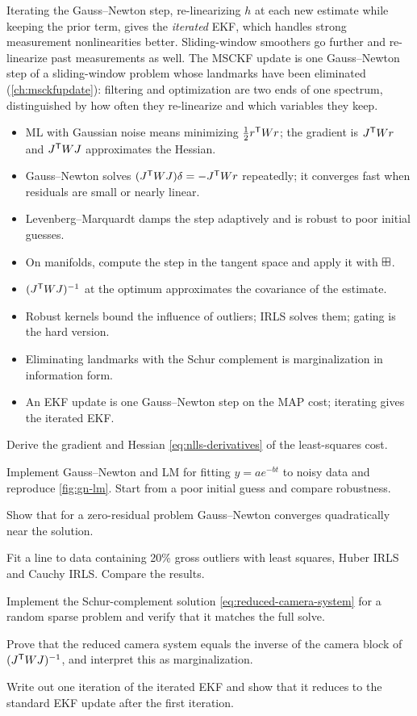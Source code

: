 Iterating the Gauss--Newton step, re-linearizing $h$ at each new estimate while keeping the prior term, gives the \emph{iterated} EKF, which
handles strong measurement nonlinearities better. Sliding-window smoothers go further and re-linearize past measurements as well. The MSCKF update
is one Gauss--Newton step of a sliding-window problem whose landmarks have been eliminated (\cref{ch:msckfupdate}): filtering and optimization
are two ends of one spectrum, distinguished by how often they re-linearize and which variables they keep.

\begin{takeaways}
\begin{itemize}
  \item ML with Gaussian noise means minimizing $\tfrac12 r^{\mathsf{T}} Wr$; the gradient is $J^{\mathsf{T}} Wr$ and $J^{\mathsf{T}} WJ$ approximates the Hessian.
  \item Gauss--Newton solves $(J^{\mathsf{T}} WJ)\delta = -J^{\mathsf{T}} Wr$ repeatedly; it converges fast when residuals are small or nearly linear.
  \item Levenberg--Marquardt damps the step adaptively and is robust to poor initial guesses.
  \item On manifolds, compute the step in the tangent space and apply it with $\boxplus$.
  \item $(J^{\mathsf{T}} WJ)^{-1}$ at the optimum approximates the covariance of the estimate.
  \item Robust kernels bound the influence of outliers; IRLS solves them; gating is the hard version.
  \item Eliminating landmarks with the Schur complement is marginalization in information form.
  \item An EKF update is one Gauss--Newton step on the MAP cost; iterating gives the iterated EKF.
\end{itemize}
\end{takeaways}

\begin{exercises}
  \item Derive the gradient and Hessian \eqref{eq:nlls-derivatives} of the least-squares cost.
  \item Implement Gauss--Newton and LM for fitting $y = ae^{-bt}$ to noisy data and reproduce \cref{fig:gn-lm}. Start from a poor initial guess and compare
        robustness.
  \item Show that for a zero-residual problem Gauss--Newton converges quadratically near the solution.
  \item Fit a line to data containing 20\% gross outliers with least squares, Huber IRLS and Cauchy IRLS. Compare the results.
  \item Implement the Schur-complement solution \eqref{eq:reduced-camera-system} for a random sparse problem and verify that it matches the full solve.
  \item Prove that the reduced camera system equals the inverse of the camera block of $(J^{\mathsf{T}} WJ)^{-1}$, and interpret this as marginalization.
  \item Write out one iteration of the iterated EKF and show that it reduces to the standard EKF update after the first iteration.
\end{exercises}

